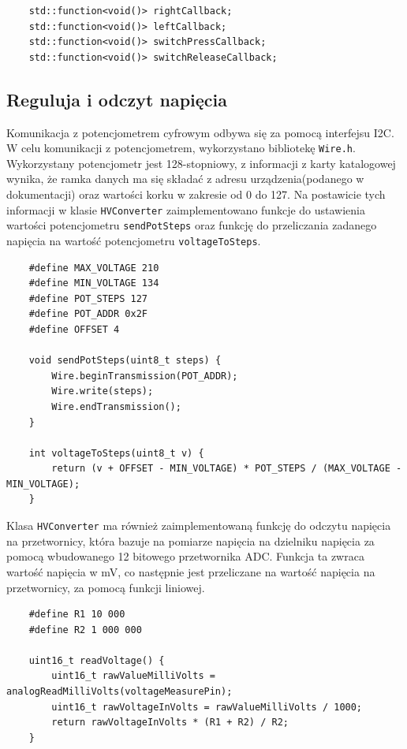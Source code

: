 \documentclass[../main.tex]{subfiles}
\begin{document}
\begin{verbatim}
    std::function<void()> rightCallback;
    std::function<void()> leftCallback;
    std::function<void()> switchPressCallback;
    std::function<void()> switchReleaseCallback;
\end{verbatim}

\subsection{Reguluja i odczyt napięcia} 
Komunikacja z potencjometrem cyfrowym odbywa się za pomocą interfejsu I2C.
 W celu komunikacji z potencjometrem, wykorzystano bibliotekę \texttt{Wire.h}. Wykorzystany potencjometr jest 128-stopniowy, z informacji z 
 karty katalogowej \cite{st:potencjometr} wynika, że ramka danych ma się składać z adresu urządzenia(podanego w dokumentacji) oraz wartości korku w zakresie od 0 do 127.
 Na postawicie tych informacji w klasie \texttt{HVConverter} zaimplementowano funkcje do ustawienia wartości potencjometru \texttt{sendPotSteps} oraz funkcję 
 do przeliczania zadanego napięcia na wartość potencjometru \texttt{voltageToSteps}.

\begin{verbatim}
    #define MAX_VOLTAGE 210
    #define MIN_VOLTAGE 134
    #define POT_STEPS 127
    #define POT_ADDR 0x2F
    #define OFFSET 4

    void sendPotSteps(uint8_t steps) {
        Wire.beginTransmission(POT_ADDR);
        Wire.write(steps);
        Wire.endTransmission();
    }
    
    int voltageToSteps(uint8_t v) {
        return (v + OFFSET - MIN_VOLTAGE) * POT_STEPS / (MAX_VOLTAGE - MIN_VOLTAGE);
    }

\end{verbatim}

Klasa \texttt{HVConverter} ma również zaimplementowaną funkcję do odczytu napięcia na przetwornicy, która bazuje na pomiarze napięcia na dzielniku napięcia za pomocą 
wbudowanego 12 bitowego przetwornika ADC. Funkcja ta zwraca wartość napięcia w mV, co następnie jest przeliczane na wartość napięcia na przetwornicy, za pomocą 
funkcji liniowej.

\begin{verbatim}
    #define R1 10 000
    #define R2 1 000 000

    uint16_t readVoltage() {
        uint16_t rawValueMilliVolts = analogReadMilliVolts(voltageMeasurePin);
        uint16_t rawVoltageInVolts = rawValueMilliVolts / 1000;
        return rawVoltageInVolts * (R1 + R2) / R2;
    }
\end{verbatim}
\end{document}

